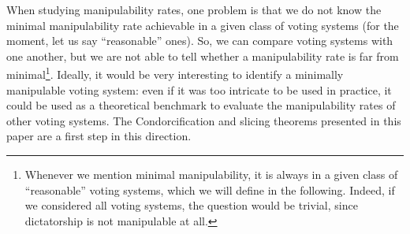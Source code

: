 
\medskip
When studying manipulability rates, one problem is that we do not know the minimal manipulability rate achievable in a given class of voting systems (for the moment, let us say ``reasonable'' ones). So, we can compare voting systems with one another, but we are not able to tell whether a manipulability rate is far from minimal\footnote{Whenever we mention minimal manipulability, it is always in a given class of ``reasonable'' voting systems, which we will define in the following. Indeed, if we considered all voting systems, the question would be trivial, since dictatorship is not manipulable at all.}. 
Ideally, it would be very interesting to identify a minimally manipulable voting system: even if it was too intricate to be used in practice, it could be used as a theoretical benchmark to evaluate the manipulability rates of other voting systems. The Condorcification and slicing theorems presented in this paper are a first step in this direction.



%


